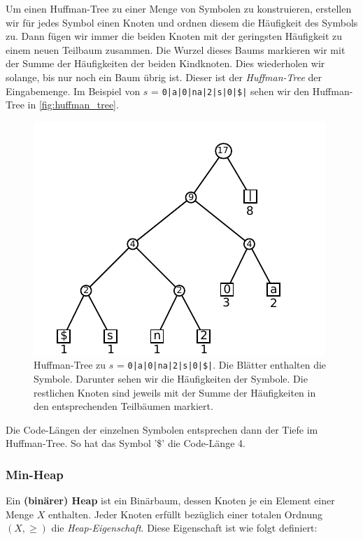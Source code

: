 \documentclass[a4paper,11pt]{scrartcl}%
\theoremstyle{change}
\theoremstyle{nonumberplain}
\theoremstyle{change}
\theoremstyle{nonumberplain}
\theoremstyle{change}
\theoremstyle{nonumberplain}
\begin{document}
Um einen Huffman-Tree zu einer Menge von Symbolen zu konstruieren, erstellen wir für jedes Symbol einen Knoten und ordnen diesem die Häufigkeit des Symbols zu. Dann fügen wir immer die beiden Knoten mit der geringsten Häufigkeit zu einem neuen Teilbaum zusammen. Die Wurzel dieses Baums markieren wir mit der Summe der Häufigkeiten der beiden Kindknoten.
Dies wiederholen wir solange, bis nur noch ein Baum übrig ist. Dieser ist der \textit{Huffman-Tree} der Eingabemenge\cite[S. 39]{storerDataCompression}. Im Beispiel von $s$ = \texttt{0|a|0|na|2|s|0|\$|} sehen wir den Huffman-Tree in \autoref{fig:huffman_tree}.

	\begin{figure}[h]
		\begin{center}
		
		 \includegraphics[scale=0.9]{./pics/huffman_Tree}
		 \end{center}
		
		\caption{Huffman-Tree zu $s$ = \texttt{0|a|0|na|2|s|0|\$|}. Die Blätter enthalten die Symbole. Darunter sehen wir die Häufigkeiten der Symbole. Die restlichen Knoten sind jeweils mit der Summe der Häufigkeiten in den entsprechenden Teilbäumen markiert.}
		\label{fig:huffman_tree}
	\end{figure}
	
Die Code-Längen der einzelnen Symbolen entsprechen dann der Tiefe im Huffman-Tree. So hat das Symbol '\$' die Code-Länge 4.


\subsubsection{Min-Heap}\label{min-heap}

Ein \textbf{(binärer) Heap} ist ein Binärbaum, dessen Knoten je ein Element einer Menge $X$ enthalten. Jeder Knoten erfüllt bezüglich einer totalen Ordnung $(X,\geq)$ die \textit{Heap-Eigenschaft}. Diese Eigenschaft ist wie folgt definiert:
\end{document}
